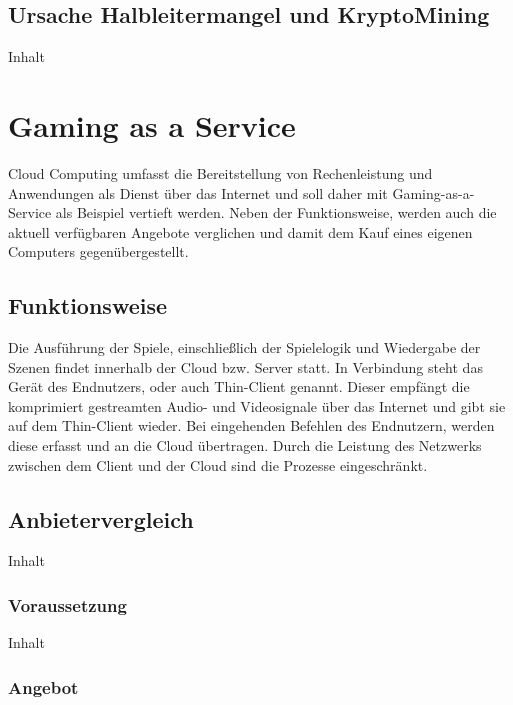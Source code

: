 \documentclass[12pt,toc=bib,toc=listof]{scrreprt}
\begin{document}
\section{Ursache Halbleitermangel und KryptoMining}
\label{sec:Ursache Halbleitermangel und KryptoMining}

Inhalt

\chapter{Gaming as a Service}
\label{sec: Gaming as a Service}

Cloud Computing umfasst die Bereitstellung von Rechenleistung und Anwendungen als Dienst über das Internet und soll daher mit Gaming-as-a-Service als Beispiel vertieft werden. Neben der Funktionsweise, werden auch die aktuell verfügbaren Angebote verglichen und damit dem Kauf eines eigenen Computers gegenübergestellt.

\section{Funktionsweise}
\label{sec:Funktionsweise}

Die Ausführung der Spiele, einschließlich der Spielelogik und Wiedergabe der Szenen findet innerhalb der Cloud bzw. Server statt. In Verbindung steht das Gerät des Endnutzers, oder auch Thin-Client genannt. Dieser empfängt die komprimiert gestreamten Audio- und Videosignale über das Internet und gibt sie auf dem Thin-Client wieder. Bei eingehenden Befehlen des Endnutzern, werden diese erfasst und an die Cloud übertragen. Durch die Leistung des Netzwerks zwischen dem Client und der Cloud sind die Prozesse eingeschränkt.

\section{Anbietervergleich}
\label{sec:Anbietervergleich}

Inhalt

\subsection{Voraussetzung}
\label{sec:Vorraussetzung}

Inhalt

\subsection{Angebot}
\label{sec:Angebot}
\end{document}
